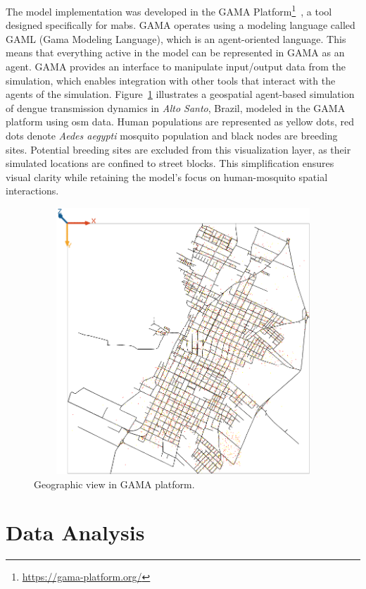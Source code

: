 The model implementation was developed in the GAMA
Platform\footnote{\url{https://gama-platform.org/}}~\citep{taillandier:2019}, a
tool designed specifically for \gls{mabs}. GAMA operates using a modeling
language called GAML (Gama Modeling Language), which is an agent-oriented
language. This means that everything active in the model can be represented in
GAMA as an agent. GAMA provides an interface to manipulate input/output data
from the simulation, which enables integration with other tools that interact
with the agents of the simulation. Figure~\ref{fig:example-gama} illustrates a
geospatial agent-based simulation of dengue transmission dynamics in
\textit{Alto Santo}, Brazil, modeled in the GAMA platform using \gls{osm} data.
Human populations are represented as yellow dots, red dots denote \textit{Aedes
	aegypti} mosquito population and black nodes are breeding sites. Potential
breeding sites are excluded from this visualization layer, as their simulated
locations are confined to street blocks. This simplification ensures visual
clarity while retaining the model’s focus on human-mosquito spatial
interactions.

\begin{figure}[!ht]
	\centering
	\includegraphics[width=16cm, height=10cm]{images/gama-example.png}
	\caption{Geographic view in GAMA platform.}
	\label{fig:example-gama}
\end{figure}

\section{Data Analysis}\label{sec:data-analysis}

